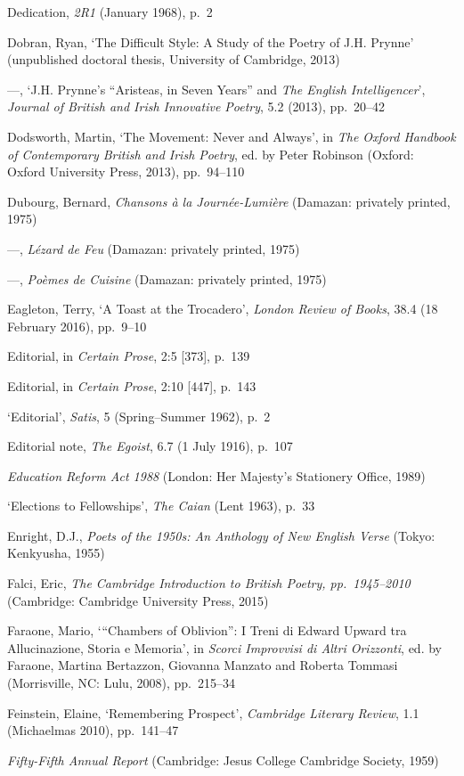 \documentclass[]{article}
\begin{document}
Dedication, \emph{2R1} (January 1968), p.~2

Dobran, Ryan, ‘The Difficult Style: A Study of the Poetry of J.H.
Prynne’ (unpublished doctoral thesis, University of Cambridge, 2013)

—, ‘J.H. Prynne’s “Aristeas, in Seven Years” and \emph{The English
Intelligencer}’, \emph{Journal of British and Irish Innovative Poetry},
5.2 (2013), pp.~20–42

Dodsworth, Martin, ‘The Movement: Never and Always’, in \emph{The Oxford
Handbook of Contemporary British and Irish Poetry}, ed. by Peter
Robinson (Oxford: Oxford University Press, 2013), pp.~94–110

Dubourg, Bernard, \emph{Chansons à la Journée-Lumière} (Damazan:
privately printed, 1975)

—, \emph{Lézard de Feu} (Damazan: privately printed, 1975)

—, \emph{Poèmes de Cuisine} (Damazan: privately printed, 1975)

Eagleton, Terry, ‘A Toast at the Trocadero’, \emph{London Review of
Books}, 38.4 (18 February 2016), pp.~9–10

Editorial, in \emph{Certain Prose}, 2:5 {[}373{]}, p.~139

Editorial, in \emph{Certain Prose}, 2:10 {[}447{]}, p.~143

‘Editorial’, \emph{Satis}, 5 (Spring–Summer 1962), p.~2

Editorial note, \emph{The Egoist}, 6.7 (1 July 1916), p.~107

\emph{Education Reform Act 1988} (London: Her Majesty’s Stationery
Office, 1989)

‘Elections to Fellowships’, \emph{The Caian} (Lent 1963), p.~33

Enright, D.J., \emph{Poets of the 1950s: An Anthology of New English
Verse} (Tokyo: Kenkyusha, 1955)

Falci, Eric, \emph{The Cambridge Introduction to British Poetry,
pp.~1945–2010} (Cambridge: Cambridge University Press, 2015)

Faraone, Mario, ‘“Chambers of Oblivion”: I Treni di Edward Upward tra
Allucinazione, Storia e Memoria’, in \emph{Scorci Improvvisi di Altri
Orizzonti}, ed. by Faraone, Martina Bertazzon, Giovanna Manzato and
Roberta Tommasi (Morrisville, NC: Lulu, 2008), pp.~215–34

Feinstein, Elaine, ‘Remembering Prospect’, \emph{Cambridge Literary
Review}, 1.1 (Michaelmas 2010), pp.~141–47

\emph{Fifty-Fifth Annual Report} (Cambridge: Jesus College Cambridge
Society, 1959)
\end{document}
